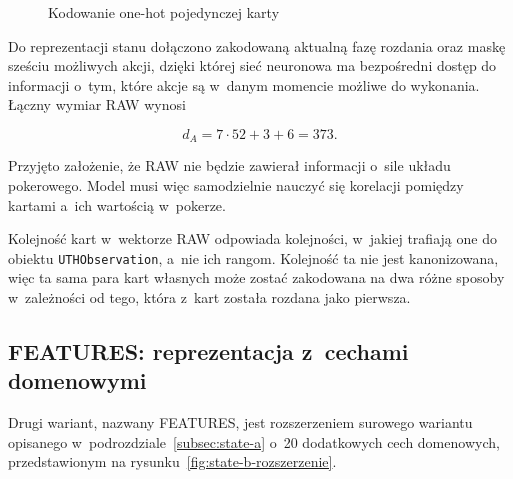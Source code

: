 \begin{figure}[htbp]
    \centering
    \caption{Kodowanie one-hot pojedynczej karty}
    \label{fig:one-hot-karta}
\end{figure}

Do reprezentacji stanu dołączono zakodowaną aktualną fazę rozdania oraz
maskę sześciu możliwych akcji, dzięki której sieć neuronowa ma
bezpośredni dostęp do informacji o~tym, które akcje są w~danym
momencie możliwe do wykonania.
Łączny wymiar RAW wynosi

\begin{equation}
    d_A = 7 \cdot 52 + 3 + 6 = 373.
    \label{eq:state-a-dim}
\end{equation}

Przyjęto założenie, że RAW nie będzie zawierał informacji o~sile układu
pokerowego. Model musi więc samodzielnie nauczyć się korelacji pomiędzy
kartami a~ich wartością w~pokerze.

Kolejność kart w~wektorze RAW odpowiada kolejności, w~jakiej trafiają one do
obiektu \texttt{UTHObservation}, a~nie ich rangom. Kolejność ta nie jest
kanonizowana, więc ta sama para kart własnych może zostać
zakodowana na dwa różne sposoby w~zależności od tego, która z~kart została
rozdana jako pierwsza.

\subsection{FEATURES: reprezentacja z~cechami domenowymi}
\label{subsec:state-b}

Drugi wariant, nazwany FEATURES, jest rozszerzeniem surowego wariantu
opisanego w~podrozdziale~\ref{subsec:state-a} o~20 dodatkowych cech
domenowych, przedstawionym na rysunku~\ref{fig:state-b-rozszerzenie}.

